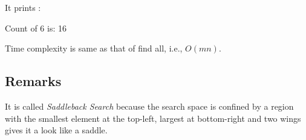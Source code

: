 

It prints :
\begin{boxedverbatim}
Count of 6 is: 16
\end{boxedverbatim}

Time complexity is same as that of find all, i.e., $O(mn)$.

\subsection{Remarks}
It is called \emph{Saddleback Search} because the search space is confined by a region with the smallest element at the top-left, largest at bottom-right and two wings gives it a look like a saddle.





